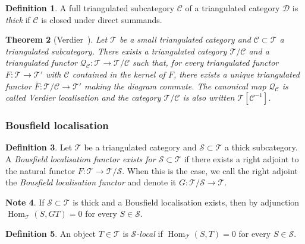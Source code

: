 \documentclass[12pt,a4paper]{article}
\newtheorem{theorem}{Theorem}[section]
\theoremstyle{definition}
\newtheorem{definition}[theorem]{Definition}
\newtheorem{note}[theorem]{Note}
\newcommand{\Hom}{\operatorname{Hom}}
\begin{document}
\begin{definition}\label{def:thick}
A full triangulated subcategory $\mathcal{C}$ of a triangulated category $\mathcal{D}$
is \emph{thick} if $\mathcal{C}$ is closed under direct summands.
\end{definition}

\begin{theorem}[Verdier~\cite{Ver77}]\label{thm:Verdier-localisation}
Let $\mathcal{T}$ be a small triangulated category and $\mathcal{C}\subset\mathcal{T}$
a triangulated subcategory.  There exists a triangulated category $\mathcal{T}/\mathcal{C}$
and a triangulated functor $\mathcal{Q}_\mathcal{C}:\mathcal{T}\to\mathcal{T}/\mathcal{C}$
such that, for every triangulated functor $F:\mathcal{T}\to\mathcal{T}'$ with
$\mathcal{C}$ contained in the kernel of $F$, there exists a unique triangulated
functor $\bar{F}:\mathcal{T}/\mathcal{C}\to\mathcal{T}'$ making the diagram commute.
The canonical map $\mathcal{Q}_\mathcal{C}$ is called \emph{Verdier localisation} and
the category $\mathcal{T}/\mathcal{C}$ is also written $\mathcal{T}[\mathcal{C}^{-1}]$.
\end{theorem}

\subsubsection{Bousfield localisation}

\begin{definition}\label{def:Bousfield-loc}
Let $\mathcal{T}$ be a triangulated category and $\mathcal{S}\subset\mathcal{T}$ a
thick subcategory.  A \emph{Bousfield localisation functor exists for
$\mathcal{S}\subset\mathcal{T}$} if there exists a right adjoint to the natural
functor $F:\mathcal{T}\to\mathcal{T}/\mathcal{S}$.  When this is the case, we call
the right adjoint the \emph{Bousfield localisation functor} and denote it
$G:\mathcal{T}/\mathcal{S}\to\mathcal{T}$.
\end{definition}

\begin{note}\label{note:S-local}
If $\mathcal{S}\subset\mathcal{T}$ is thick and a Bousfield localisation exists, then
by adjunction $\Hom_\mathcal{T}(S,GT)=0$ for every $S\in\mathcal{S}$.
\end{note}

\begin{definition}\label{def:S-local}
An object $T\in\mathcal{T}$ is \emph{$\mathcal{S}$-local} if
$\Hom_\mathcal{T}(S,T)=0$ for every $S\in\mathcal{S}$.
\end{definition}
\end{document}
